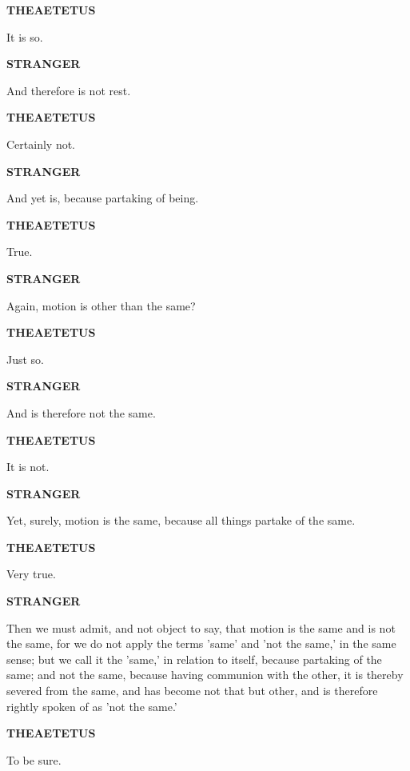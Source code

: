 \documentclass[11pt,letter]{article}
\begin{document}
\par \textbf{THEAETETUS}
\par   It is so.

\par \textbf{STRANGER}
\par   And therefore is not rest.

\par \textbf{THEAETETUS}
\par   Certainly not.

\par \textbf{STRANGER}
\par   And yet is, because partaking of being.

\par \textbf{THEAETETUS}
\par   True.

\par \textbf{STRANGER}
\par   Again, motion is other than the same?

\par \textbf{THEAETETUS}
\par   Just so.

\par \textbf{STRANGER}
\par   And is therefore not the same.

\par \textbf{THEAETETUS}
\par   It is not.

\par \textbf{STRANGER}
\par   Yet, surely, motion is the same, because all things partake of the same.

\par \textbf{THEAETETUS}
\par   Very true.

\par \textbf{STRANGER}
\par   Then we must admit, and not object to say, that motion is the same and is not the same, for we do not apply the terms 'same' and 'not the same,' in the same sense; but we call it the 'same,' in relation to itself, because partaking of the same; and not the same, because having communion with the other, it is thereby severed from the same, and has become not that but other, and is therefore rightly spoken of as 'not the same.'

\par \textbf{THEAETETUS}
\par   To be sure.
\end{document}
